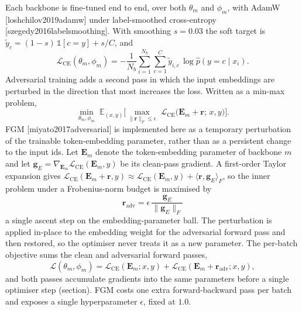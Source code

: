\documentclass[11pt,a4paper]{article}
\def\citep#1{[#1]}%
\def\cref#1{section}%
\begin{document}
Each backbone is fine-tuned end to end, over both $\theta_m$ and $\phi_m$, with AdamW \citep{loshchilov2019adamw} under label-smoothed cross-entropy \citep{szegedy2016labelsmoothing}. With smoothing $s = 0.03$ the soft target is $\tilde{y}_c = (1-s)\,\mathbb{1}[c = y] + s/C$, and
\begin{equation}
\mathcal{L}_{\mathrm{CE}}(\theta_m, \phi_m) = -\frac{1}{N_b}\sum_{i=1}^{N_b}\sum_{c=1}^{C} \tilde{y}_{i,c}\,\log \hat{p}(y = c \mid x_i).
\label{eq:ce}
\end{equation}
Adversarial training adds a second pass in which the input embeddings are perturbed in the direction that most increases the loss. Written as a min-max problem,
\begin{equation}
\min_{\theta_m, \phi_m}\; \mathbb{E}_{(x,y)}\Big[\max_{\|\mathbf{r}\|_F \le \epsilon}\; \mathcal{L}_{\mathrm{CE}}\big(\mathbf{E}_m + \mathbf{r};\,x,y\big)\Big].
\label{eq:minmax}
\end{equation}
FGM \citep{miyato2017adversarial} is implemented here as a temporary perturbation of the trainable token-embedding parameter, rather than as a persistent change to the input ids. Let $\mathbf{E}_m$ denote the token-embedding parameter of backbone $m$ and let $\mathbf{g}_{E}=\nabla_{\mathbf{E}_m}\mathcal{L}_{\mathrm{CE}}(\mathbf{E}_m,y)$ be its clean-pass gradient. A first-order Taylor expansion gives $\mathcal{L}_{\mathrm{CE}}(\mathbf{E}_m+\mathbf{r}, y) \approx \mathcal{L}_{\mathrm{CE}}(\mathbf{E}_m,y)+\langle\mathbf{r},\mathbf{g}_{E}\rangle_F$, so the inner problem under a Frobenius-norm budget is maximised by
\begin{equation}
\boxed{\;\mathbf{r}_{\mathrm{adv}} = \epsilon\,\frac{\mathbf{g}_{E}}{\|\mathbf{g}_{E}\|_F}\;}
\label{eq:fgm}
\end{equation}
a single ascent step on the embedding-parameter ball. The perturbation is applied in-place to the embedding weight for the adversarial forward pass and then restored, so the optimiser never treats it as a new parameter. The per-batch objective sums the clean and adversarial forward passes,
\begin{equation}
\mathcal{L}(\theta_m, \phi_m) = \mathcal{L}_{\mathrm{CE}}(\mathbf{E}_m; x,y) + \mathcal{L}_{\mathrm{CE}}(\mathbf{E}_m + \mathbf{r}_{\mathrm{adv}}; x,y),
\label{eq:fgm-loss}
\end{equation}
and both passes accumulate gradients into the same parameters before a single optimiser step (\cref{alg:fgm}). FGM costs one extra forward-backward pass per batch and exposes a single hyperparameter $\epsilon$, fixed at $1.0$.
\end{document}
